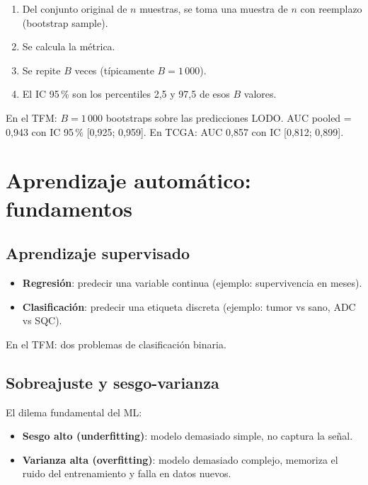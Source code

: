 \documentclass[11pt, a4paper]{article}
\begin{document}
\begin{enumerate}[leftmargin=1.4em]
  \item Del conjunto original de $n$ muestras, se toma una muestra de
  $n$ con reemplazo (bootstrap sample).
  \item Se calcula la m\'etrica.
  \item Se repite $B$ veces (t\'ipicamente $B = 1\,000$).
  \item El IC 95\,\% son los percentiles 2,5 y 97,5 de esos $B$ valores.
\end{enumerate}

En el TFM: $B = 1\,000$ bootstraps sobre las predicciones LODO. AUC
pooled = 0,943 con IC 95\,\% [0,925; 0,959]. En TCGA: AUC 0,857 con IC
[0,812; 0,899].

\section{Aprendizaje autom\'atico: fundamentos}

\subsection{Aprendizaje supervisado}

\begin{itemize}[leftmargin=1.2em]
  \item \textbf{Regresi\'on}: predecir una variable continua (ejemplo:
  supervivencia en meses).
  \item \textbf{Clasificaci\'on}: predecir una etiqueta discreta
  (ejemplo: tumor vs sano, ADC vs SQC).
\end{itemize}

En el TFM: dos problemas de clasificaci\'on binaria.

\subsection{Sobreajuste y sesgo-varianza}

El dilema fundamental del ML:

\begin{itemize}[leftmargin=1.2em]
  \item \textbf{Sesgo alto (underfitting)}: modelo demasiado simple, no
  captura la se\~nal.
  \item \textbf{Varianza alta (overfitting)}: modelo demasiado complejo,
  memoriza el ruido del entrenamiento y falla en datos nuevos.
\end{itemize}
\end{document}

